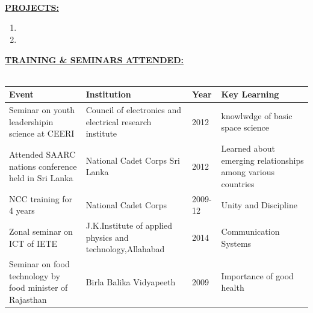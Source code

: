 \documentclass{article}
\begin{document}
			\\
			\\
			\\
			\underline{\textbf{PROJECTS:}}\\
			\begin{enumerate}
				\item 
				\item
			\end{enumerate}
			\underline{\textbf{TRAINING \& SEMINARS ATTENDED:}}\\
			\\
			\begin{tabular}{|p{4.5cm}|p{4.5cm}|p{2cm}|p{4cm}|}
				\hline
				\textbf{Event} & \textbf{Institution} & \textbf{Year} & \textbf{Key Learning}\\
				\hline
				Seminar on youth leadershipin science at CEERI & Council of electronics and electrical research institute & 2012 & knowlwdge of basic space science \\
				\hline
				Attended SAARC  nations conference held in Sri Lanka & National Cadet Corps Sri Lanka & 2012 & Learned about emerging relationships among various countries \\
				\hline
				NCC training for 4 years & National Cadet Corps & 2009-12 & Unity and Discipline \\
				\hline
				Zonal seminar on ICT of IETE & J.K.Institute of applied physics and technology,Allahabad & 2014 & Communication Systems\\
				\hline
				Seminar on food technology by food minister of Rajasthan & Birla Balika Vidyapeeth & 2009 & Importance of good health \\
				\hline
			\end{tabular}
\end{document}
